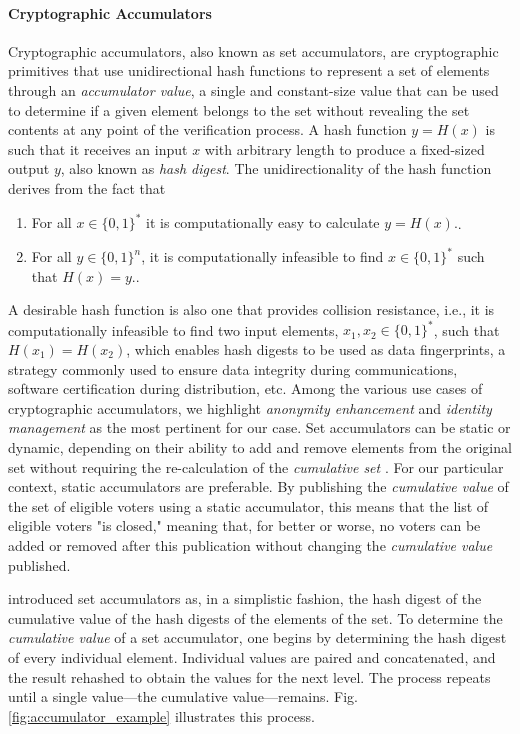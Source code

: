 \documentclass[../main.tex]{subfiles}
\begin{document}
\paragraph{Cryptographic Accumulators}
\label{cryptographic_accumulators}
Cryptographic accumulators, also known as set accumulators, are cryptographic primitives that use unidirectional hash functions to represent a set of elements through an \textit{accumulator value}, a single and constant-size value that can be used to determine if a given element belongs to the set without revealing the set contents at any point of the verification process. A hash function $ y = H(x) $ is such that it receives an input $ x $ with arbitrary length to produce a fixed-sized output $ y $, also known as \textit{hash digest}. The unidirectionality of the hash function derives from the fact that

\begin{enumerate}

    \item{For all $ x \in \{0, 1\}^* $ it is computationally easy to calculate $ y = H(x) $.}.

    \item{For all $ y \in \{0, 1\}^n $, it is computationally infeasible to find $ x \in \{0, 1\}^* $ such that $ H(x) = y $.}.

\end{enumerate}

A desirable hash function is also one that provides collision resistance, i.e., it is computationally infeasible to find two input elements, $ x_1, x_2 \in \{0,1\}^* $, such that $ H(x_1) = H(x_2) $, which enables hash digests to be used as data fingerprints, a strategy commonly used to ensure data integrity during communications, software certification during distribution, etc. Among the various use cases of cryptographic accumulators, we highlight \textit{anonymity enhancement} and \textit{identity management} as the most pertinent for our case. Set accumulators can be static or dynamic, depending on their ability to add and remove elements from the original set without requiring the re-calculation of the \textit{cumulative set} \cite{Loporchio2023}. For our particular context, static accumulators are preferable. By publishing the \textit{cumulative value} of the set of eligible voters using a static accumulator, this means that the list of eligible voters "is closed," meaning that, for better or worse, no voters can be added or removed after this publication without changing the \textit{cumulative value} published.
\par
\cite{Benaloh1993} introduced set accumulators as, in a simplistic fashion, the hash digest of the cumulative value of the hash digests of the elements of the set. To determine the \textit{cumulative value} of a set accumulator, one begins by determining the hash digest of every individual element. Individual values are paired and concatenated, and the result rehashed to obtain the values for the next level. The process repeats until a single value—the cumulative value—remains. Fig. \ref{fig:accumulator_example} illustrates this process.
\end{document}
